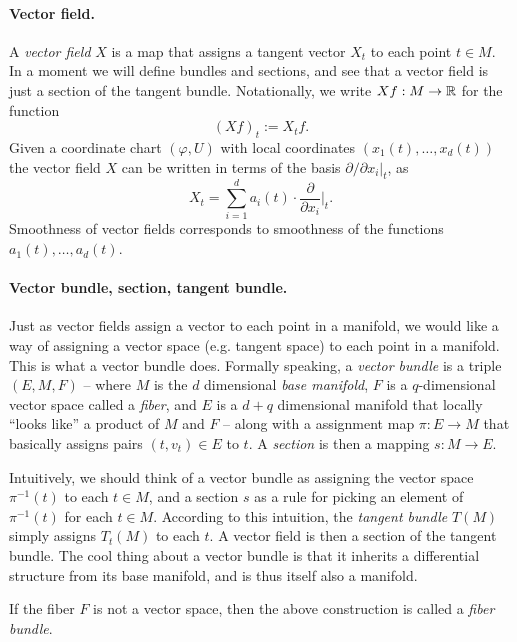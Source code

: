 \documentclass{article}
\begin{document}
	\paragraph{Vector field.}
	A \emph{vector field} $X$ is a map that assigns a tangent vector $X_t$ to each point $t \in M$. In a moment we will define bundles and sections, and see that a vector field is just a section of the tangent bundle. Notationally, we write $Xf: M \to \mathbb{R}$ for the function 
	\begin{equation*}
		(Xf)_{t} := X_tf.
	\end{equation*}
	Given a coordinate chart $(\varphi,U)$ with local coordinates $(x_1(t),\ldots,x_d(t))$ the vector field $X$ can be written in terms of the basis $\partial/\partial x_i|_{t}$, as 
	\begin{equation*}
		X_t = \sum_{i = 1}^{d} a_i(t) \cdot \frac{\partial}{\partial x_i} \Big|_{t}. 
	\end{equation*}
	Smoothness of vector fields corresponds to smoothness of the functions $a_1(t),\ldots,a_d(t)$.
	
	\paragraph{Vector bundle, section, tangent bundle.} 
	Just as vector fields assign a vector to each point in a manifold, we would like a way of assigning a vector space (e.g. tangent space) to each point in a manifold. This is what a vector bundle does.  Formally speaking, a \emph{vector bundle} is a triple $(E,M,F)$ -- where $M$ is the $d$ dimensional \emph{base manifold}, $F$ is a $q$-dimensional vector space called a \emph{fiber}, and $E$ is a $d + q$ dimensional manifold that locally ``looks like'' a product of $M$ and $F$ -- along with a assignment map $\pi: E \to M$ that basically assigns pairs $(t,v_t) \in E$ to $t$.  A \emph{section} is then a mapping $s: M \to E$.
	
	Intuitively, we should think of a vector bundle as assigning the vector space $\pi^{-1}(t)$ to each $t \in M$, and a section $s$ as a rule for picking an element of $\pi^{-1}(t)$ for each $t \in M$. According to this intuition, the \emph{tangent bundle} $T(M)$ simply assigns $T_t(M)$ to each $t$. A vector field is then a section of the tangent bundle. The cool thing about a vector bundle is that it inherits a differential structure from its base manifold, and is thus itself also a manifold. 
	
	If the fiber $F$ is not a vector space, then the above construction is called a \emph{fiber bundle}.
	
\end{document}
